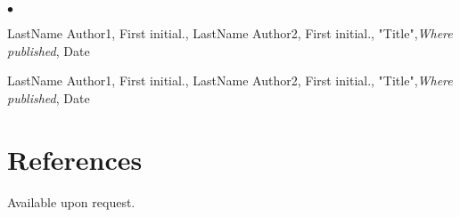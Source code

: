 \documentclass[margin,line]{res}
\newenvironment{list2}{
  \begin{list}{$\bullet$}{%
      \setlength{\itemsep}{0in}
      \setlength{\parsep}{0in} \setlength{\parskip}{0in}
      \setlength{\topsep}{0in} \setlength{\partopsep}{0in}
      \setlength{\leftmargin}{0.2in}}}{\end{list}}
\begin{document}
\begin{resume}
\begin{list2}
\item LastName Author1, First initial., LastName Author2, First initial.,  "Title",{\em Where published}, Date
\item LastName Author1, First initial., LastName Author2, First initial.,  "Title",{\em Where published}, Date
\end{list2}


\section{\sc References }
Available upon request.
\fi
\end{resume}
\end{document}

